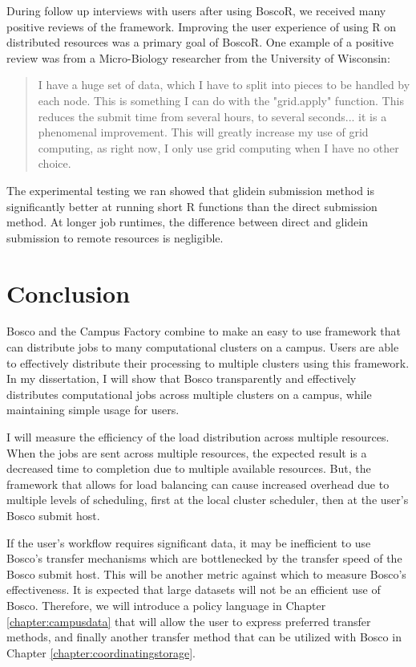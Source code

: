 During follow up interviews with users after using BoscoR, we received many positive reviews of the framework.  Improving the user experience of using R on distributed resources was a primary goal of BoscoR.  One example of a positive review was from a Micro-Biology researcher from the University of Wisconsin:
\begin{quote}
I have a huge set of data, which I have to split into pieces to be handled by each node.  This is something I can do with the "grid.apply" function. This reduces the submit time from several hours, to several seconds... it is a  phenomenal improvement. This will greatly increase my use of grid computing, as right now, I only use grid computing when I have no other choice.
\end{quote}

The experimental testing we ran showed that glidein submission method is significantly better at running short R functions than the direct submission method.  At longer job runtimes, the difference between direct and glidein submission to remote resources is negligible.






\section{Conclusion}

Bosco and the Campus Factory combine to make an easy to use framework that can distribute jobs to many computational clusters on a campus.  Users are able to effectively distribute their processing to multiple clusters using this framework.  In my dissertation, I will show that Bosco transparently and effectively distributes computational jobs across multiple clusters on a campus, while maintaining simple usage for users.

I will measure the efficiency of the load distribution across multiple resources.  When the jobs are sent across multiple resources, the expected result is a decreased time to completion due to multiple available resources.  But, the framework that allows for load balancing can cause increased overhead due to multiple levels of scheduling, first at the local cluster scheduler, then at the user's Bosco submit host.

If the user's workflow requires significant data, it may be inefficient to use Bosco's transfer mechanisms which are bottlenecked by the transfer speed of the Bosco submit host.  This will be another metric against which to measure Bosco's effectiveness.  It is expected that large datasets will not be an efficient use of Bosco.  Therefore, we will introduce a policy language in Chapter \ref{chapter:campusdata} that will allow the user to express preferred transfer methods, and finally another transfer method that can be utilized with Bosco in Chapter \ref{chapter:coordinatingstorage}.



